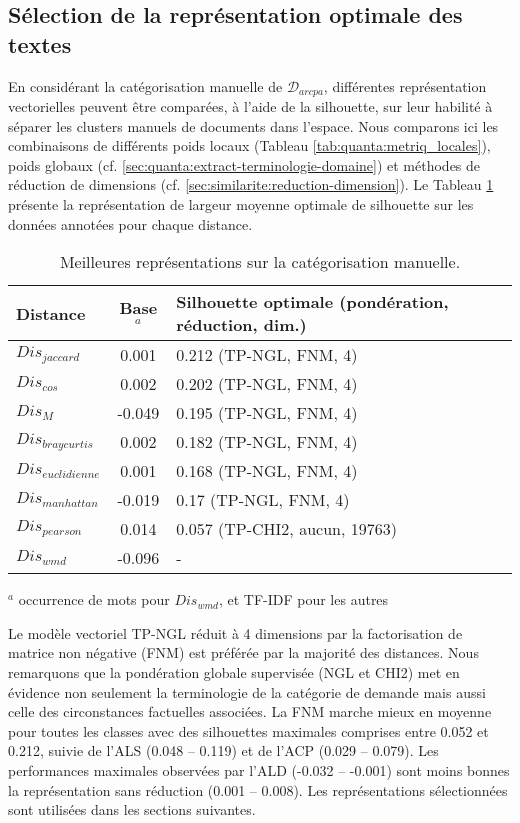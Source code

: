 \subsection{Sélection de la représentation optimale des textes}
\label{sec:similarite:select-repr-optimal}
En considérant la catégorisation manuelle de $\mathcal{D}_{arcpa}$, différentes représentation vectorielles peuvent être comparées, à l'aide de la silhouette, sur leur habilité à séparer les clusters manuels de documents dans l'espace. Nous comparons ici les combinaisons de différents poids locaux (Tableau \ref{tab:quanta:metriq_locales}), poids globaux (cf. \ref{sec:quanta:extract-terminologie-domaine}) et méthodes de réduction de dimensions (cf. \ref{sec:similarite:reduction-dimension}). 
Le Tableau \ref{tab:similarite:silhouette-vecteur-manuel} présente la représentation de largeur moyenne optimale de silhouette sur les données annotées pour chaque distance. 

\begin{table}[!htb]
	\scriptsize \centering
	\begin{tabular}[pos]{|l|c|l|}
		\hline
		\textbf{Distance}&\textbf{Base$^a$}&\textbf{Silhouette optimale   (pondération, réduction, dim.)} \\ \hline
		$Dis_{jaccard}$ & 0.001 & 0.212 (TP-NGL, FNM, 4) \\ \hline
		$Dis_{cos}$ & 0.002 & 0.202 (TP-NGL, FNM, 4) \\ \hline
		$Dis_{M}$ & -0.049 & 0.195 (TP-NGL, FNM, 4) \\ \hline
		$Dis_{braycurtis}$ & 0.002& 0.182 (TP-NGL, FNM, 4) \\ \hline
		$Dis_{euclidienne}$ & 0.001& 0.168  (TP-NGL, FNM, 4) \\ \hline
		$Dis_{manhattan}$ & -0.019& 0.17   (TP-NGL, FNM, 4) \\ \hline
		$Dis_{pearson}$ & 0.014 & 0.057 (TP-CHI2, aucun, 19763) \\ \hline
		$Dis_{wmd}$ & -0.096 &  - \\ \hline
	\end{tabular}

	$^a$ occurrence de mots pour $Dis_{wmd}$, et TF-IDF pour les autres
    \caption{Meilleures représentations sur la catégorisation manuelle.} \label{tab:similarite:silhouette-vecteur-manuel}
\end{table}

 
Le modèle vectoriel TP-NGL réduit à 4 dimensions par la factorisation de matrice non négative (FNM) est préférée par la majorité des distances. Nous remarquons que la pondération globale supervisée (NGL et CHI2) met en évidence non seulement la terminologie de la catégorie de demande mais aussi celle des circonstances factuelles associées. La FNM marche mieux en moyenne pour toutes les classes avec des silhouettes maximales comprises entre 0.052 et 0.212, suivie de l'ALS (0.048 -- 0.119) et de l'ACP (0.029 -- 0.079). Les performances maximales observées par l'ALD (-0.032 -- -0.001) sont moins bonnes la représentation sans réduction (0.001 -- 0.008). %
Les représentations sélectionnées sont utilisées dans les sections suivantes.
